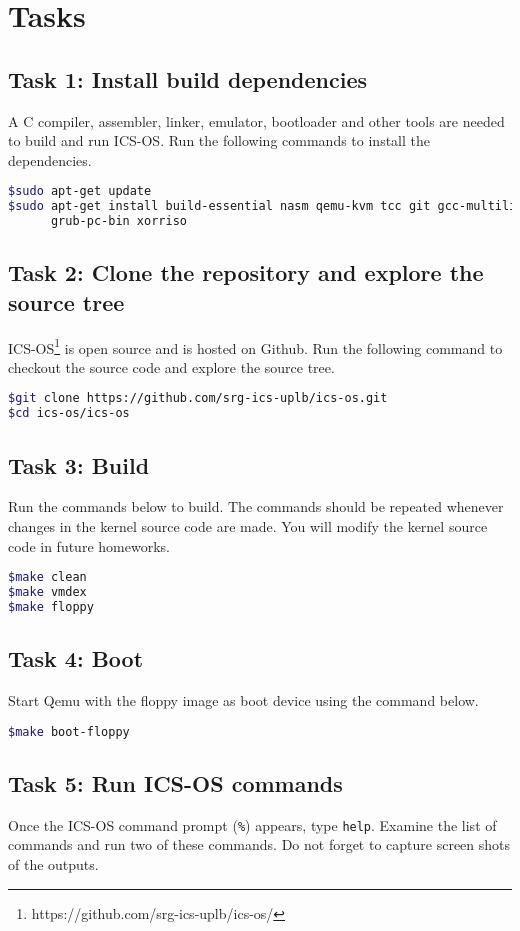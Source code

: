 \documentclass[a4paper, 11pt,oneside]{article}
\begin{document}
\section{Tasks}

\subsection*{Task 1: Install build dependencies}
A C compiler, assembler, linker, emulator, bootloader and other tools are needed to 
build and run ICS-OS. Run the following commands to install the dependencies.

\begin{lstlisting}[language=bash,frame=single]
$sudo apt-get update
$sudo apt-get install build-essential nasm qemu-kvm tcc git gcc-multilib \
      grub-pc-bin xorriso
\end{lstlisting}

\subsection*{Task 2: Clone the repository and explore the source tree}
ICS-OS\footnote{https://github.com/srg-ics-uplb/ics-os/} is open source and is hosted on Github. Run the following command to 
checkout the source code and explore the source tree.
\begin{lstlisting}[language=bash,frame=single] 
$git clone https://github.com/srg-ics-uplb/ics-os.git
$cd ics-os/ics-os
\end{lstlisting}

\subsection*{Task 3: Build}
Run the commands below to build. The commands should be repeated 
whenever changes in the kernel source code are made. You will modify the kernel source 
code in future homeworks. 
\begin{lstlisting}[language=bash,frame=single] 
$make clean
$make vmdex
$make floppy 
\end{lstlisting}

\subsection*{Task 4: Boot}
Start Qemu with the floppy image as boot device using the command below. 
\begin{lstlisting}[language=bash,frame=single] 
$make boot-floppy 
\end{lstlisting}

\subsection*{Task 5: Run ICS-OS commands}
Once the ICS-OS command prompt (\texttt{\%}) appears, type \texttt{help}. 
Examine the list of commands and run two of these commands. Do not forget 
to capture screen shots of the outputs.

\end{document}
